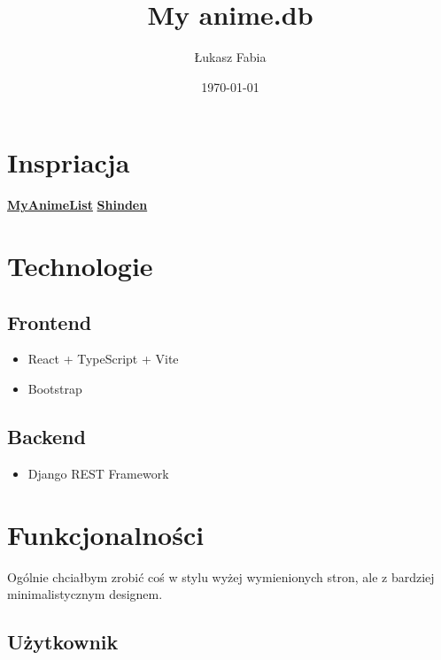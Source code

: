 \documentclass[a4paper]{article}
\title{My anime.db}
\author{Łukasz Fabia}
\date{\today}
\begin{document}
\maketitle

\section{Inspriacja}

\quad \href{https://myanimelist.net/}{\textbf{MyAnimeList}}
\quad \href{https://shinden.pl/}{\textbf{Shinden}}


\section{Technologie}
\subsection{Frontend}
\begin{itemize}
    \item React + TypeScript + Vite
    \item Bootstrap
\end{itemize}

\subsection{Backend}

\begin{itemize}
    \item Django REST Framework
\end{itemize}


\section{Funkcjonalności}

\quad Ogólnie chciałbym zrobić coś w stylu wyżej wymienionych stron, ale z bardziej minimalistycznym designem.

\subsection{Użytkownik}
\end{document}
